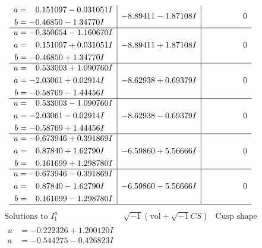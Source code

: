 \documentclass[1p]{elsarticle_modified}
\theoremstyle{definition}
\newcommand{\I}{\sqrt{-1}}
\begin{document}
$$\begin{array}{c|c|c}
\begin{aligned}
a &= \phantom{-}0.151097 - 0.031051 I \\
b &= -0.46850 - 1.34770 I\end{aligned}
 & -8.89411 - 1.87108 I & \phantom{-0.000000 } 0 \\ \hline\begin{aligned}
u &= -0.350654 - 1.160670 I \\
a &= \phantom{-}0.151097 + 0.031051 I \\
b &= -0.46850 + 1.34770 I\end{aligned}
 & -8.89411 + 1.87108 I & \phantom{-0.000000 } 0 \\ \hline\begin{aligned}
u &= \phantom{-}0.533003 + 1.090760 I \\
a &= -2.03061 + 0.02914 I \\
b &= -0.58769 - 1.44456 I\end{aligned}
 & -8.62938 + 0.69379 I & \phantom{-0.000000 } 0 \\ \hline\begin{aligned}
u &= \phantom{-}0.533003 - 1.090760 I \\
a &= -2.03061 - 0.02914 I \\
b &= -0.58769 + 1.44456 I\end{aligned}
 & -8.62938 - 0.69379 I & \phantom{-0.000000 } 0 \\ \hline\begin{aligned}
u &= -0.673946 + 0.391869 I \\
a &= \phantom{-}0.87840 + 1.62790 I \\
b &= \phantom{-}0.161699 + 1.298780 I\end{aligned}
 & -6.59860 + 5.56666 I & \phantom{-0.000000 } 0 \\ \hline\begin{aligned}
u &= -0.673946 - 0.391869 I \\
a &= \phantom{-}0.87840 - 1.62790 I \\
b &= \phantom{-}0.161699 - 1.298780 I\end{aligned}
 & -6.59860 - 5.56666 I & \phantom{-0.000000 } 0\\
 \hline 
 \end{array}$$\newpage$$\begin{array}{c|c|c}  
\text{Solutions to }I^u_{1}& \I (\text{vol} + \sqrt{-1}CS) & \text{Cusp shape}\\
 \hline 
\begin{aligned}
u &= -0.222326 + 1.200120 I \\
a &= -0.544275 - 0.426823 I \\

\end{aligned}
\end{array}$$
\end{document}

